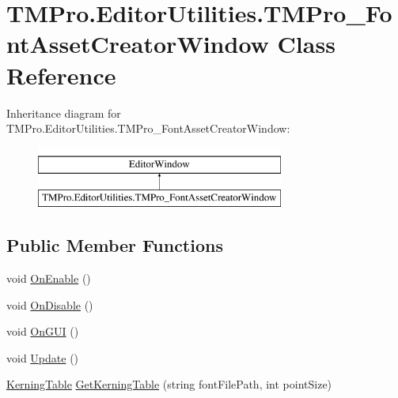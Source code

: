 \hypertarget{class_t_m_pro_1_1_editor_utilities_1_1_t_m_pro___font_asset_creator_window}{}\section{T\+M\+Pro.\+Editor\+Utilities.\+T\+M\+Pro\+\_\+\+Font\+Asset\+Creator\+Window Class Reference}
\label{class_t_m_pro_1_1_editor_utilities_1_1_t_m_pro___font_asset_creator_window}
Inheritance diagram for T\+M\+Pro.\+Editor\+Utilities.\+T\+M\+Pro\+\_\+\+Font\+Asset\+Creator\+Window\+:\begin{figure}[H]
\begin{center}
\leavevmode
\includegraphics[height=2.000000cm]{class_t_m_pro_1_1_editor_utilities_1_1_t_m_pro___font_asset_creator_window}
\end{center}
\end{figure}
\subsection*{Public Member Functions}
\begin{DoxyCompactItemize}
\item 
void \mbox{\hyperlink{class_t_m_pro_1_1_editor_utilities_1_1_t_m_pro___font_asset_creator_window_a92b04c483491694e0a6589141310ab84}{On\+Enable}} ()
\item 
void \mbox{\hyperlink{class_t_m_pro_1_1_editor_utilities_1_1_t_m_pro___font_asset_creator_window_a47eec290255d3982c222d61a5986a31c}{On\+Disable}} ()
\item 
void \mbox{\hyperlink{class_t_m_pro_1_1_editor_utilities_1_1_t_m_pro___font_asset_creator_window_acec42eaf35e7fd464492fd0a016c404e}{On\+G\+UI}} ()
\item 
void \mbox{\hyperlink{class_t_m_pro_1_1_editor_utilities_1_1_t_m_pro___font_asset_creator_window_a3acb07af5f723170bb73abc76d7b6de1}{Update}} ()
\item 
\mbox{\hyperlink{class_t_m_pro_1_1_kerning_table}{Kerning\+Table}} \mbox{\hyperlink{class_t_m_pro_1_1_editor_utilities_1_1_t_m_pro___font_asset_creator_window_a2bb78015866feff6586b41f196d77e75}{Get\+Kerning\+Table}} (string font\+File\+Path, int point\+Size)
\end{DoxyCompactItemize}
